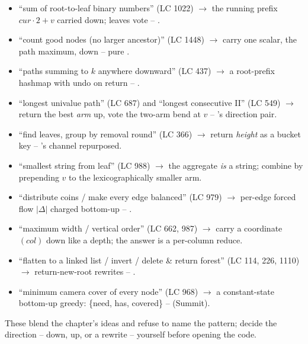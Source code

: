 \begin{itemize}[nosep, leftmargin=1.4em]
  \item ``sum of root-to-leaf binary numbers'' (LC 1022) $\longrightarrow$ the running
        prefix $\mathit{cur}\cdot 2+v$ carried down; leaves vote -- .
  \item ``count good nodes (no larger ancestor)'' (LC 1448) $\longrightarrow$ carry one
        scalar, the path maximum, down -- pure .
  \item ``paths summing to $k$ anywhere downward'' (LC 437) $\longrightarrow$ a root-prefix
        hashmap with undo on return -- .
  \item ``longest univalue path'' (LC 687) and ``longest consecutive II'' (LC 549)
        $\longrightarrow$ return the best \emph{arm} up, vote the two-arm bend at $v$ --
        's direction pair.
  \item ``find leaves, group by removal round'' (LC 366) $\longrightarrow$ return
        \emph{height} as a bucket key -- 's channel repurposed.
  \item ``smallest string from leaf'' (LC 988) $\longrightarrow$ the aggregate \emph{is}
        a string; combine by prepending $v$ to the lexicographically smaller arm.
  \item ``distribute coins / make every edge balanced'' (LC 979) $\longrightarrow$
        per-edge forced flow $|\Delta|$ charged bottom-up -- .
  \item ``maximum width / vertical order'' (LC 662, 987) $\longrightarrow$ carry a
        coordinate $(\mathit{col})$ down like a depth; the answer is a per-column reduce.
  \item ``flatten to a linked list / invert / delete \& return forest'' (LC 114, 226,
        1110) $\longrightarrow$ return-new-root rewrites -- .
  \item ``minimum camera cover of every node'' (LC 968) $\longrightarrow$ a constant-state
        bottom-up greedy: \{need, has, covered\} --  (Summit).
\end{itemize}


These blend the chapter's ideas and refuse to name the pattern; decide the direction --
down, up, or a rewrite -- yourself before opening the code.

